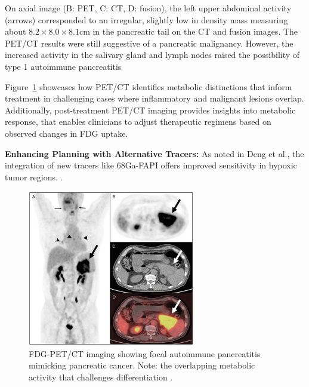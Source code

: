 \begin{multicols}{2}
On axial image (B: PET, C: CT, D: fusion), the left upper abdominal activity (arrows) corresponded to an irregular, slightly low in density mass measuring about $8.2 \times 8.0 \times 8.1 \text{cm}$ in the pancreatic tail on the CT and fusion images. The PET/CT results were still suggestive of a pancreatic malignancy. However,
the increased activity in the salivary gland and  lymph nodes raised the possibility of type 1 autoimmune pancreatitis

Figure~\ref{fig:Zheng1} showcases how PET/CT identifies metabolic distinctions that inform treatment in challenging cases where inflammatory and malignant lesions overlap. Additionally, post-treatment PET/CT imaging provides insights into metabolic response, that enables clinicians to adjust therapeutic regimens based on observed changes in FDG uptake. 

\textbf{Enhancing Planning with Alternative Tracers:} As noted in Deng et al., the integration of new tracers like 68Ga-FAPI offers improved sensitivity in hypoxic tumor regions. \cite{Deng2021}.

\end{multicols}

\begin{figure}[ht]
	\centering
	\includegraphics[width=0.65\textwidth]{assets/Zheng1.png}
	\caption{FDG-PET/CT imaging showing focal autoimmune pancreatitis mimicking pancreatic cancer. Note: the overlapping metabolic activity that challenges differentiation \cite{Zheng2018}.}
	\label{fig:Zheng1}
\end{figure}


